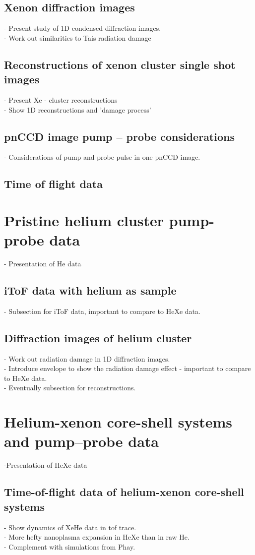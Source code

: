 \subsection{Xenon diffraction images}
- Present study of 1D condensed diffraction images.\\
- Work out similarities to Tais radiation damage
%
%
%
\subsection{Reconstructions of xenon cluster single shot images}
- Present Xe - cluster reconstructions\\
- Show 1D reconstructions and 'damage process'
%
%
%
\subsection{pnCCD image pump -- probe considerations}
- Considerations of pump and probe pulse in one pnCCD image.
%
%
%
\subsection{Time of flight data}
%
%
%
\section{Pristine helium cluster pump-probe data}\label{sec:helium-data}
- Presentation of He data
\subsection{iToF data with helium as sample}
- Subsection for iToF data, important to compare to HeXe data.
\subsection{Diffraction images of helium cluster}
- Work out radiation damage in 1D diffraction images.\\
- Introduce envelope to show the radiation damage effect - important to compare to HeXe data.\\
- Eventually subsection for reconstructions.
%
%
%
\section{Helium-xenon core-shell systems and pump--probe data}\label{sec:helium-xenon-data}
-Presentation of HeXe data
\subsection{Time-of-flight data of helium-xenon core-shell systems}
- Show dynamics of XeHe data in tof trace.\\
- More hefty nanoplasma expansion in HeXe than in raw He.\\
- Complement with simulations from Phay.
